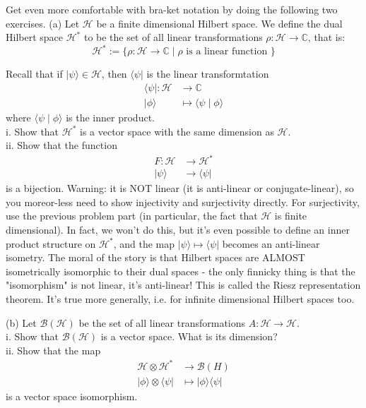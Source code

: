 
\begin{problem}
	Get even more comfortable with bra-ket notation by doing the following two exercises.
(a) Let $\mathcal{H}$ be a finite dimensional Hilbert space. We define the dual Hilbert space $\mathcal{H}^*$ to be the set of all linear transformations $\rho: \mathcal{H} \rightarrow \mathbb{C}$, that is:
\[
\mathcal{H}^*:=\{\rho: \mathcal{H} \rightarrow \mathbb{C} \mid \rho \text { is a linear function }\}
\]

Recall that if $|\psi\rangle \in \mathcal{H}$, then $\langle\psi|$ is the linear transformtation
\[
\begin{aligned}
\langle\psi|: \mathcal{H} & \rightarrow \mathbb{C} \\
|\phi\rangle & \mapsto\langle\psi \mid \phi\rangle
\end{aligned}
\]
where $\langle\psi \mid \phi\rangle$ is the inner product.\\
i. Show that $\mathcal{H}^*$ is a vector space with the same dimension as $\mathcal{H}$.\\
ii. Show that the function
\[
\begin{aligned}
F: \mathcal{H} & \rightarrow \mathcal{H}^* \\
|\psi\rangle & \rightarrow\langle\psi|
\end{aligned}
\]
is a bijection. Warning: it is NOT linear (it is anti-linear or conjugate-linear), so you moreor-less need to show injectivity and surjectivity directly. For surjectivity, use the previous problem part (in particular, the fact that $\mathcal{H}$ is finite dimensional).
In fact, we won't do this, but it's even possible to define an inner product structure on $\mathcal{H}^*$, and the map $|\psi\rangle \mapsto\langle\psi|$ becomes an anti-linear isometry. The moral of the story is that Hilbert spaces are ALMOST isometrically isomorphic to their dual spaces - the only finnicky thing is that the "isomorphism" is not linear, it's anti-linear! This is called the Riesz representation theorem. It's true more generally, i.e. for infinite dimensional Hilbert spaces too.

(b) Let $\mathcal{B}(\mathcal{H})$ be the set of all linear transformations $A: \mathcal{H} \rightarrow \mathcal{H}$.\\
i. Show that $\mathcal{B}(\mathcal{H})$ is a vector space. What is its dimension?\\
ii. Show that the map
\[
\begin{aligned}
\mathcal{H} \otimes \mathcal{H}^* & \rightarrow \mathcal{B}(H) \\
|\phi\rangle \otimes\langle\psi| & \mapsto|\phi\rangle\langle\psi|
\end{aligned}
\]
is a vector space isomorphism.
\end{problem}

